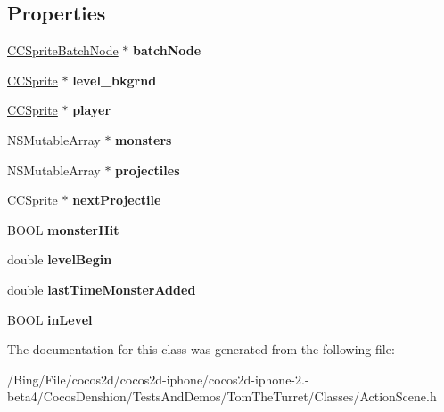 \subsection*{Properties}
\begin{DoxyCompactItemize}
\item 
\hypertarget{interface_action_layer_a53ac580e4113f0d93d22e85f32298a1c}{\hyperlink{interface_c_c_sprite_batch_node}{C\-C\-Sprite\-Batch\-Node} $\ast$ {\bfseries batch\-Node}}\label{interface_action_layer_a53ac580e4113f0d93d22e85f32298a1c}

\item 
\hypertarget{interface_action_layer_aca405641113b0f10d511f03dabb98674}{\hyperlink{class_c_c_sprite}{C\-C\-Sprite} $\ast$ {\bfseries level\-\_\-bkgrnd}}\label{interface_action_layer_aca405641113b0f10d511f03dabb98674}

\item 
\hypertarget{interface_action_layer_af8923c62ac7d22588ede57f5b8fa5c02}{\hyperlink{class_c_c_sprite}{C\-C\-Sprite} $\ast$ {\bfseries player}}\label{interface_action_layer_af8923c62ac7d22588ede57f5b8fa5c02}

\item 
\hypertarget{interface_action_layer_a635aa63cc71a81fbb47d41837d1a3d7a}{N\-S\-Mutable\-Array $\ast$ {\bfseries monsters}}\label{interface_action_layer_a635aa63cc71a81fbb47d41837d1a3d7a}

\item 
\hypertarget{interface_action_layer_a29f1f2ec5b2c8ce9896d6444e1245980}{N\-S\-Mutable\-Array $\ast$ {\bfseries projectiles}}\label{interface_action_layer_a29f1f2ec5b2c8ce9896d6444e1245980}

\item 
\hypertarget{interface_action_layer_a8d749f16ec833d3732b93e5450845287}{\hyperlink{class_c_c_sprite}{C\-C\-Sprite} $\ast$ {\bfseries next\-Projectile}}\label{interface_action_layer_a8d749f16ec833d3732b93e5450845287}

\item 
\hypertarget{interface_action_layer_ab7659179429bd9882834c67d7e1dba21}{B\-O\-O\-L {\bfseries monster\-Hit}}\label{interface_action_layer_ab7659179429bd9882834c67d7e1dba21}

\item 
\hypertarget{interface_action_layer_ac2b3387e9e14fa677538fc8add3f56d0}{double {\bfseries level\-Begin}}\label{interface_action_layer_ac2b3387e9e14fa677538fc8add3f56d0}

\item 
\hypertarget{interface_action_layer_aa3657ccdb11fcba7ebf618e0fce94363}{double {\bfseries last\-Time\-Monster\-Added}}\label{interface_action_layer_aa3657ccdb11fcba7ebf618e0fce94363}

\item 
\hypertarget{interface_action_layer_afbd3de55c093929dcdd06dcb76666d92}{B\-O\-O\-L {\bfseries in\-Level}}\label{interface_action_layer_afbd3de55c093929dcdd06dcb76666d92}

\end{DoxyCompactItemize}


The documentation for this class was generated from the following file\-:\begin{DoxyCompactItemize}
\item 
/\-Bing/\-File/cocos2d/cocos2d-\/iphone/cocos2d-\/iphone-\/2.-\/beta4/\-Cocos\-Denshion/\-Tests\-And\-Demos/\-Tom\-The\-Turret/\-Classes/Action\-Scene.\-h\end{DoxyCompactItemize}
